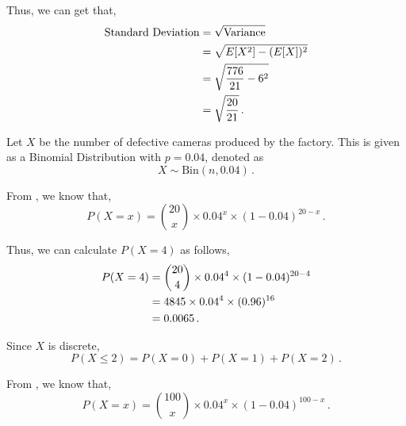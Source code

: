 \begin{subquestions}
\begin{subsubquestions}
Thus, we can get that,
\begin{align}
	\text{Standard Deviation} & = \sqrt{\text{Variance}} \nonumber \\
	                          & = \sqrt{E[X^2] - (E[X])^2} \nonumber \\
	                          & = \sqrt{\frac{776}{21}- 6^2} \nonumber \\
	                          & = \sqrt{\frac{20}{21}} \,.
\end{align}

\end{subsubquestions}
	
	
\subquestion

Let $X$ be the number of defective cameras produced by the factory. This is given as a Binomial Distribution with $p=0.04$, denoted as
\begin{equation}
	X \sim \text{Bin}(n,0.04) \,.
\end{equation}

\begin{subsubquestions}
	
\subsubquestion

From , we know that,
\begin{equation}
	P(X = x) = { 20 \choose x} \times 0.04^x \times (1-0.04)^{20-x} \,.
\end{equation}

Thus, we can calculate $P(X=4)$ as follows,
\begin{align}
	P(X = 4) & = { 20 \choose 4} \times 0.04^4 \times (1-0.04)^{20-4} \nonumber \\
	         & = 4845 \times 0.04^4 \times (0.96)^{16} \nonumber \\
	         & = 0.0065 \,.
\end{align}


\subsubquestion

Since $X$ is discrete,
\begin{equation}
	P(X \leq 2) = P(X=0)+P(X=1)+P(X=2) \,.
\end{equation}

From , we know that,
\begin{equation}
	P(X = x) = { 100 \choose x} \times 0.04^x \times (1-0.04)^{100-x} \,.
\end{equation}


\end{subsubquestions}
\end{subquestions}
